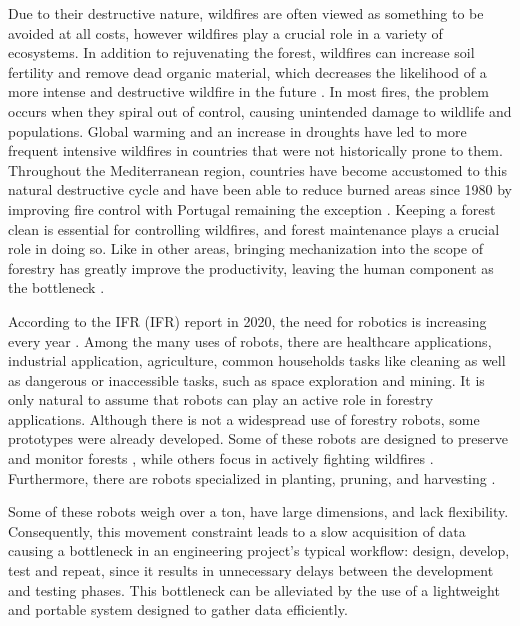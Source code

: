 Due to their destructive nature, wildfires are often viewed as something to be avoided at all costs, however wildfires play a crucial role in a variety of ecosystems. In addition to rejuvenating the forest, wildfires can increase soil fertility and remove dead organic material, which decreases the likelihood of a more intense and destructive wildfire in the future \cite{bond_fires_2017}. In most fires, the problem occurs when they spiral out of control, causing unintended damage to wildlife and populations. Global warming and an increase in droughts have led to more frequent intensive wildfires in countries that were not historically prone to them. Throughout the Mediterranean region, countries have become accustomed to this natural destructive cycle and have been able to reduce burned areas since 1980 by improving fire control with Portugal remaining the exception \cite{turco_decreasing_2016, european_commission_joint_research_centre_forest_2021}. Keeping a forest clean is essential for controlling wildfires, and forest maintenance plays a crucial role in doing so. Like in other areas, bringing mechanization into the scope of forestry has greatly improve the productivity, leaving the human component as the bottleneck \cite{parker_robotics_2016}.

According to the \acl{IFR} (\acs{IFR}) report in 2020, the need for robotics is increasing every year  \cite{IFR_robot_report_2020}. Among the many uses of robots, there are healthcare applications, industrial application, agriculture, common households tasks like cleaning as well as dangerous or inaccessible tasks, such as space exploration and mining. It is only natural to assume that robots can play an active role in forestry applications. Although there is not a widespread use of forestry robots, some prototypes were already developed.  Some of these robots are designed to preserve and monitor forests \cite{couceiro_semfire_2019, jelavic_towards_2021, lam_flexible_2011, notomista_slothbot_2019}, while others focus in actively fighting wildfires \cite{noauthor_firefighting_2014, hose_cartridge, hydra}. Furthermore, there are robots specialized in planting, pruning, and harvesting \cite{noauthor_multiscope_nodate, molina_aerial_2017, zhang_rubber-tapping_2019}.

Some of these robots weigh over a ton, have large dimensions, and lack flexibility. Consequently, this movement constraint leads to a slow acquisition of data causing a bottleneck in an engineering project's typical workflow: design, develop, test and repeat, since it results in unnecessary delays between the development and testing phases. This bottleneck can be alleviated by the use of a lightweight and portable system designed to gather data efficiently.

